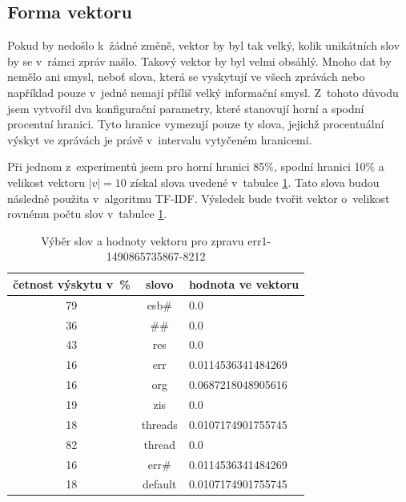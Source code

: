\documentclass[thesis=M,czech]{FITthesis}[2012/10/20]
\begin{document}
		\subsection{Forma vektoru}
		Pokud by nedošlo k~žádné změně, vektor by byl tak velký, kolik unikátních slov by se v~rámci zpráv našlo. Takový vektor by byl velmi obsáhlý. Mnoho dat by nemělo ani smysl, neboť slova, která se vyskytují ve všech zprávách nebo například pouze v~jedné nemají příliš velký informační smysl. Z~tohoto důvodu jsem vytvořil dva konfigurační parametry, které stanovují horní a spodní procentní hranici. Tyto hranice vymezují pouze ty slova, jejichž procentuální výskyt ve zprávách je právě v~intervalu vytyčeném hranicemi.  
		
		Při jednom z~experimentů jsem pro horní hranici 85\%, spodní hranici 10\%  a velikost vektoru $|v| = 10$ získal slova uvedené v~tabulce \ref{tab:vector-err}. Tato slova budou následně použita v~algoritmu TF-IDF. Výsledek bude tvořit vektor o~velikost rovnému počtu slov v~tabulce \ref{tab:vector-err}.
		
		\begin{table}[htb]\centering
			\centering
			\caption{Výběr slov a hodnoty vektoru pro zpravu err1-1490865735867-8212}
			\label{tab:vector-err}
			\begin{tabular}{|c|c|l|}
				\hline
				\textbf{četnost výskytu v~\%} & \textbf{slovo} & \multicolumn{1}{c|}{\textbf{hodnota ve vektoru}} \\ \hline
				79                            & esb\#          & 0.0                                                               \\ \hline
				36                            & \#\#           & 0.0                                                               \\ \hline
				43                            & res            & 0.0                                                               \\ \hline
				16                            & err            & 0.0114536341484269                                                \\ \hline
				16                            & org            & 0.0687218048905616                                                \\ \hline
				19                            & zis            & 0.0                                                               \\ \hline
				18                            & threads        & 0.0107174901755745                                                \\ \hline
				82                            & thread         & 0.0                                                               \\ \hline
				16                            & err\#          & 0.0114536341484269                                                \\ \hline
				18                            & default        & 0.0107174901755745                                                \\ \hline
			\end{tabular}
		\end{table}
		
\end{document}
